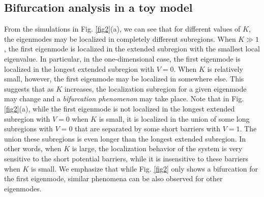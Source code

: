 \documentclass[a4paper,11pt]{article}
\begin{document}
\subsection{Bifurcation analysis in a toy model}
From the simulations in Fig. \ref{fig2}(a), we can see that for different values of $K$, the eigenmodes may be localized in completely different subregions. When $K\gg 1$, the first eigenmode is localized in the extended subregion with the smallest local eigenvalue. In particular, in the one-dimensional case, the first eigenmode is localized in the longest extended subregion with $V = 0$. When $K$ is relatively small, however, the first eigenmode may be localized in somewhere else. This suggests that as $K$ increases, the localization subregion for a given eigenmode may change and a \emph{bifurcation phenomenon} may take place. Note that in Fig. \ref{fig2}(a), while the first eigenmode is not localized in the longest extended subregion with $V = 0$ when $K$ is small, it is localized in the union of some long subregions with $V = 0$ that are separated by some short barriers with $V = 1$. The union these subregions is even longer than the longest extended subregion. In other words, when $K$ is large, the localization behavior of the system is very sensitive to the short potential barriers, while it is insensitive to these barriers when $K$ is small. We emphasize that while Fig. \ref{fig2} only shows a bifurcation for the first eigenmode, similar phenomena can be also observed for other eigenmodes.
\end{document}
